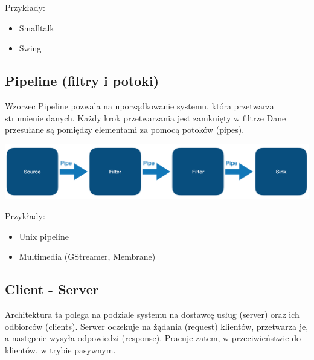 \documentclass[12pt]{article}
\begin{document}
            Przykłady:
            \begin{itemize}
                \item Smalltalk
                \item Swing
            \end{itemize}

        \subsection{Pipeline (filtry i potoki)}

            Wzorzec Pipeline pozwala na uporządkowanie systemu, która przetwarza
            strumienie danych. Każdy krok przetwarzania jest zamknięty w filtrze
            Dane przesułane są pomiędzy elementami za pomocą potoków (pipes).

            \begin{center}
                \includegraphics[scale=0.30]{patterns/pipeline.png}
            \end{center}

            Przykłady:
            \begin{itemize}
                \item Unix pipeline
                \item Multimedia (GStreamer, Membrane)
            \end{itemize}

        \subsection{Client - Server}

            Architektura ta polega na podziale systemu na dostawcę usług (server)
            oraz ich odbiorców (clients). Serwer oczekuje na żądania (request) klientów,
            przetwarza je, a następnie wysyła odpowiedzi (response). Pracuje zatem, w 
            przeciwieństwie do klientów, w trybie pasywnym.
            
\end{document}
